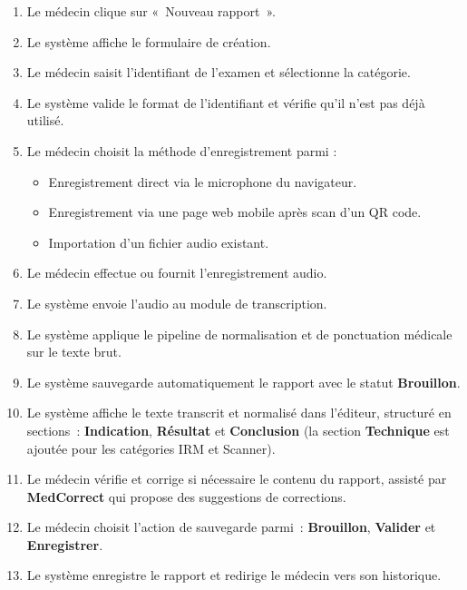 \documentclass[11pt]{article}
\begin{document}
\begin{description}[leftmargin=4.2cm, style=nextline]
    \item[Scénario principal]
    \begin{enumerate}[leftmargin=*, topsep=0pt, itemsep=0pt]
        \item Le médecin clique sur «~Nouveau rapport~».
        \item Le système affiche le formulaire de création.
        \item Le médecin saisit l'identifiant de l'examen et sélectionne la catégorie.
        \item Le système valide le format de l'identifiant et vérifie qu'il n'est pas déjà utilisé.
        \item Le médecin choisit la méthode d'enregistrement parmi :
        \begin{itemize}[leftmargin=*, nosep]
            \item Enregistrement direct via le microphone du navigateur.
            \item Enregistrement via une page web mobile après scan d'un QR code.
            \item Importation d'un fichier audio existant.
        \end{itemize}
        \item Le médecin effectue ou fournit l'enregistrement audio.
        \item Le système envoie l'audio au module de transcription.
        \item Le système applique le pipeline de normalisation et de ponctuation médicale
              sur le texte brut.
        \item Le système sauvegarde automatiquement le rapport avec le statut \textbf{Brouillon}.
        \item Le système affiche le texte transcrit et normalisé dans l'éditeur, structuré en
              sections~: \textbf{Indication}, \textbf{Résultat} et \textbf{Conclusion}
              (la section \textbf{Technique} est ajoutée pour les catégories IRM et Scanner).
        \item Le médecin vérifie et corrige si nécessaire le contenu du rapport, assisté par
              \textbf{MedCorrect} qui propose des suggestions de corrections.
        \item Le médecin choisit l'action de sauvegarde parmi~:
              \textbf{Brouillon}, \textbf{Valider} et \textbf{Enregistrer}.
        \item Le système enregistre le rapport et redirige le médecin vers son historique.
    \end{enumerate}


\end{description}
\end{document}
